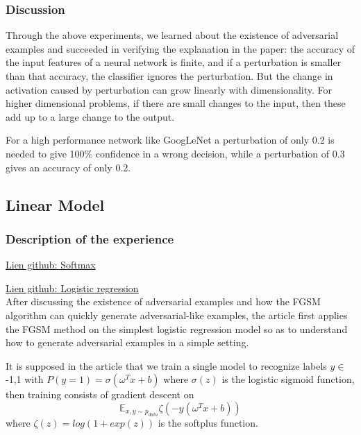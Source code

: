 \subsubsection{Discussion}
Through the above experiments, we learned about the existence of adversarial examples and succeeded in verifying the explanation in the paper: the accuracy of the input features of a neural network is finite, and if a perturbation is smaller than that accuracy, the classifier ignores the perturbation. But the change in activation caused by perturbation can grow linearly with dimensionality. For higher dimensional problems, if there are small changes to the input, then these add up to a large change to the output.

For a high performance network like GoogLeNet a perturbation of only 0.2 is needed to give 100\% confidence in a wrong decision, while a perturbation of 0.3 gives an accuracy of only 0.2.

\subsection{Linear Model}
\subsubsection{Description of the experience}
\href{https://github.com/LIUHanlin16895/MLA_projet/blob/main/src/softmax/ProjetMLA_Softmax.ipynb}{Lien github: Softmax}

\href{https://github.com/LIUHanlin16895/MLA_projet/blob/main/src/logistic_regression/ProjetMLA_LogisticRegression.ipynb}{Lien github: Logistic regression} \\

After discussing the existence of adversarial examples and how the FGSM algorithm can quickly generate adversarial-like examples, the article first applies the FGSM method on the simplest logistic regression model so as to understand how to generate adversarial examples in a simple setting. 

It is supposed in the article that we train a single model to recognize labels $y\in${-1,1} with $P(y=1) = \sigma(\omega^Tx+b)$ where $\sigma(z)$ is the logistic sigmoid function, then training consists of gradient descent on $$\mathbb{E}_{x,y\sim p_{data}}\zeta(-y(\omega^Tx+b))$$ where $\zeta(z)=log(1+exp(z))$ is the softplus function. 

